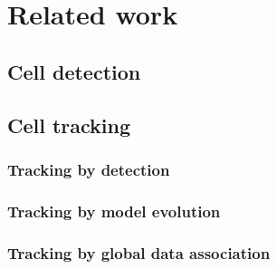 \chapter{Related work }
\label{chap:relatedwork}
	\section{Cell detection }
	\label{sec:relatedworkdetection}
	\section{Cell tracking }
		\subsection{Tracking by detection }
		\subsection{Tracking by model evolution }
		\subsection{Tracking by global data association }